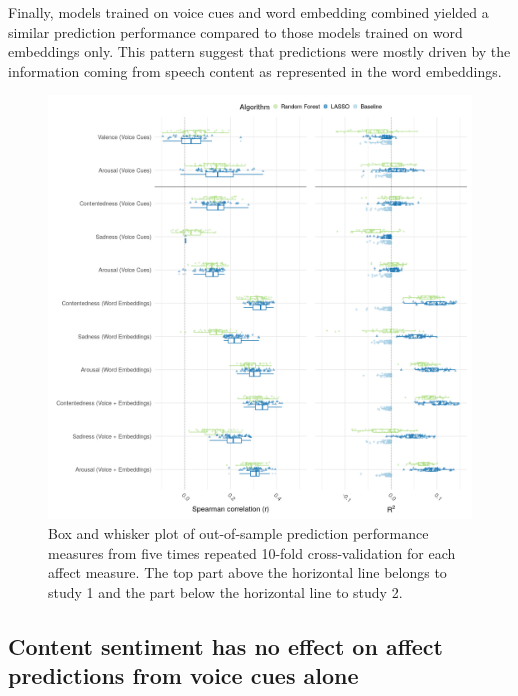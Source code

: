 \documentclass[
  english,
  man,floatsintext]{apa6}
\begin{document}
Finally, models trained on voice cues and word embedding combined yielded a similar prediction performance compared to those models trained on word embeddings only. This pattern suggest that predictions were mostly driven by the information coming from speech content as represented in the word embeddings.
\newpage

\begin{figure}

{\centering \includegraphics[width=1\linewidth,height=1\textheight]{../figures/bmr_plot} 

}

\caption[Prediction performance]{Box and whisker plot of out-of-sample prediction performance measures from five times repeated 10-fold cross-validation for each affect measure. The top part above the horizontal line belongs to study 1 and the part below the horizontal line to study 2.}\label{fig:predictionoverview}
\end{figure}
\newpage

\hypertarget{content-sentiment-has-no-effect-on-affect-predictions-from-voice-cues-alone}{%
\subsection{Content sentiment has no effect on affect predictions from voice cues alone}\label{content-sentiment-has-no-effect-on-affect-predictions-from-voice-cues-alone}}
\end{document}
